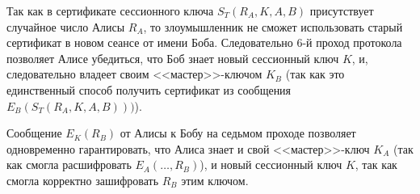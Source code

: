 Так как в сертификате сессионного ключа $S_T (R_A, K, A, B)$ присутствует случайное число Алисы $R_A$, то злоумышленник не сможет использовать старый сертификат в новом сеансе от имени Боба. Следовательно 6-й проход протокола позволяет Алисе убедиться, что Боб знает новый сессионный ключ $K$, и, следовательно владеет своим <<мастер>>-ключом $K_B$ (так как это единственный способ получить сертификат из сообщения $E_B ( S_T ( R_A, K, A, B ) ))$).

Сообщение $E_K( R_B )$ от Алисы к Бобу на седьмом проходе позволяет одновременно гарантировать, что Алиса знает и свой <<мас\-тер>>-ключ $K_A$ (так как смогла расшифровать $E_A(\dots, R_B)$), и новый сессионный ключ $K$, так как смогла корректно зашифровать $R_B$ этим ключом.

